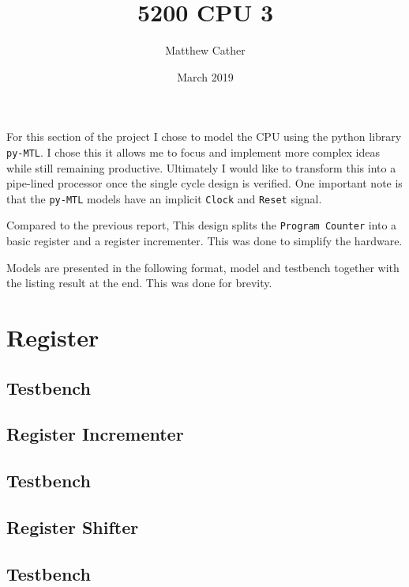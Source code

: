 \documentclass{article}
\title{5200 CPU 3}
\author{Matthew Cather}
\date{March 2019}
\begin{document}
\maketitle

For this section of the project I chose to model the CPU using the python library \texttt{py-MTL}. I chose this it allows me to focus and implement more complex ideas while still remaining productive. Ultimately I would like to transform this into a pipe-lined processor once the single cycle design is verified. One important note is that the \texttt{py-MTL} models have an implicit \texttt{Clock} and \texttt{Reset} signal.

Compared to the previous report, This design splits the \texttt{Program Counter} into a basic register and a register incrementer. This was done to simplify the hardware.

Models are presented in the following format, model and testbench together with the listing result at the end. This was done for brevity.

\tableofcontents
\clearpage

\section{Register}

\subsection{Testbench}


\subsection{Register Incrementer}

\subsection{Testbench}


\subsection{Register Shifter}

\subsection{Testbench}

\end{document}
